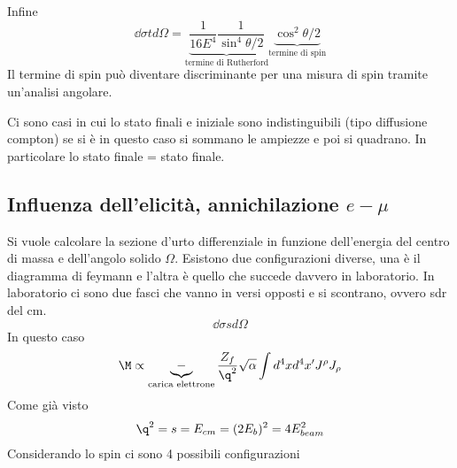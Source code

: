 \documentclass[12pt]{book}
\begin{document}
\begin{itemize}
Infine 
\begin{equation}
	\dd{\sigma}{t d \Omega} = \underbrace{\frac{1}{16E^4} \frac{1}{\sin^4 \theta/2} }_{\text{termine di Rutherford}} \underbrace{\cos^2 \theta/2}_{\text{termine di spin}}
\end{equation}
Il termine di spin può diventare discriminante per una misura di spin tramite un'analisi angolare.

Ci sono casi in cui lo stato finali e iniziale sono indistinguibili (tipo diffusione compton) se si è in questo caso si sommano le ampiezze e poi si quadrano. In particolare lo stato finale = stato finale.                  

\end{itemize}


\subsection{Influenza dell'elicità, annichilazione $e-\mu$}
Si vuole calcolare la sezione d'urto differenziale in funzione dell'energia del centro di massa e dell'angolo solido $\Omega$.  Esistono due configurazioni diverse, una è il diagramma di feymann e l'altra è quello che succede davvero in laboratorio. In laboratorio ci sono due fasci che vanno in versi opposti e si scontrano, ovvero sdr del cm.
\begin{equation}
	\dd{\sigma}{s d\Omega}
\end{equation}
In questo caso 
\begin{equation}
	\M \propto \underbrace{-}_{\text{carica elettrone}} \frac{Z_f}{\q^2}\sqrt{\alpha} \int d^4 x d^4 x' J^\rho J_\rho
\end{equation}
Come già visto 
\begin{gather}
	\q^2 = s  = E_{cm} = (2E_b)^2 = 4E_{beam}^2
\end{gather}
Considerando lo spin ci sono 4 possibili configurazioni
\end{document}
